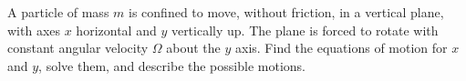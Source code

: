 \documentclass[../main.tex]{subfiles}
\begin{document}
\begin{problema}
	A particle of mass \(m\) is confined to move, without friction, in
	a vertical plane, with axes \(x\) horizontal and \(y\) vertically
	up. The plane is forced to rotate with constant angular velocity \(\Omega\)
	about the \(y\) axis. Find the equations of motion for \(x\) and \(y\),
	solve them, and describe the possible motions.
\end{problema}
\end{document}
